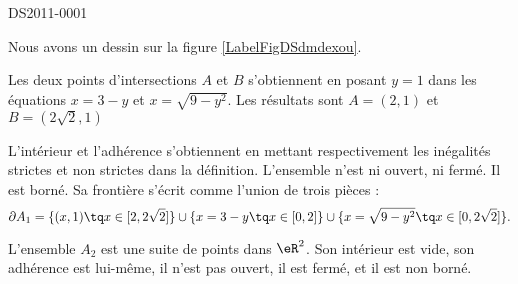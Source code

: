 \begin{corrige}{DS2011-0001}
  

    Nous avons un dessin sur la figure \ref{LabelFigDSdmdexou}.
    \newcommand{\CaptionFigDSdmdexou}{Le dessin de l'ensemble à étudier.}
    

    Les deux points d'intersections \( A\) et \( B\) s'obtiennent en posant \( y=1\) dans les équations \( x=3-y\) et \( x=\sqrt{9-y^2}\). Les résultats sont \( A=(2,1)\) et \( B=(2\sqrt{2},1)\)

    L'intérieur et l'adhérence s'obtiennent en mettant respectivement les inégalités strictes et non strictes dans la définition. L'ensemble n'est ni ouvert, ni fermé. Il est borné. Sa frontière s'écrit comme l'union de trois pièces :
    \begin{equation}
        \partial A_1=\{ (x,1)\tq x\in\mathopen[ 2,2\sqrt{2}  \mathclose] \}\cup\{ x=3-y\tq x\in\mathopen[ 0 , 2 \mathclose] \}\cup\{ x=\sqrt{9-y^2}\tq x\in\mathopen[ 0 , 2\sqrt{2} \mathclose] \}.
    \end{equation}


    L'ensemble \( A_2\) est une suite de points dans \( \eR^2\). Son intérieur est vide, son adhérence est lui-même, il n'est pas ouvert, il est fermé, et il est non borné.

\end{corrige}
